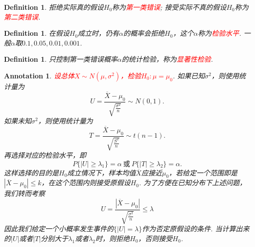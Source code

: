 \documentclass{article}
\newtheorem{definition}[theorem]{Definition}
\newtheorem{annotation}[theorem]{Annotation}
\newcommand{\redt}[1]{\textcolor{red}{#1}}
\begin{document}
\begin{definition}
\rm 拒绝实际真的假设$H_0$称为\redt{第一类错误}; 接受实际不真的假设$H_0$称为\redt{第二类错误}.
\end{definition}

\begin{definition}
\rm 在假设$H_0$成立时，仍有$\alpha$的概率会拒绝$H_0$，这个$\alpha$称为\redt{检验水平}. 一般$\alpha$取$0.1,0.05,0.01,0.001$. 
\end{definition}

\begin{definition}
\rm 只控制第一类错误概率$\alpha$的统计检验，称为\redt{显著性检验}.
\end{definition}

\begin{annotation}
\rm \redt{设总体$X \sim N(\mu,\sigma^2)$，检验$H_0: \mu=\mu_0$}. 如果已知$\sigma^2$，则使用统计量为
$$
U = \frac{\overline{X}-\mu_0}{\sqrt{\frac{\sigma^2}{n}}} \sim N(0,1).
$$
如果未知$\sigma^2$，则使用统计量为
$$
T = \frac{\overline{X}-\mu_0}{\sqrt{\frac{S^2}{n}}} \sim t(n-1).
$$
再选择对应的检验水平，即
$$
P\{|U| \geq \lambda_1 \} = \alpha~\text{或} ~ P\{|T| \geq \lambda_2 \} = \alpha.
$$
这样选择的目的是$H_0$成立情况下，样本均值$\overline{X}$应接近$\mu_0$，若给定一个范围即是$|\overline{X} - \mu_0| \leq k$，在这个范围内则接受原假设$H_0$. 为了方便在已知分布下上述问题，我们转而考察
$$
U = \frac{|\overline{X} - \mu_0|}{\sqrt{\frac{\sigma^2}{n}}} \leq \lambda
$$
因此我们给定一个小概率发生事件的$\{|U|=\lambda\}$作为否定原假设的条件. 
当计算出来的$|U|$或者$|T|$分别大于$\lambda_1$或者$\lambda_2$时，则拒绝$H_0$，否则接受$H_0$.
\end{annotation}
\end{document}
